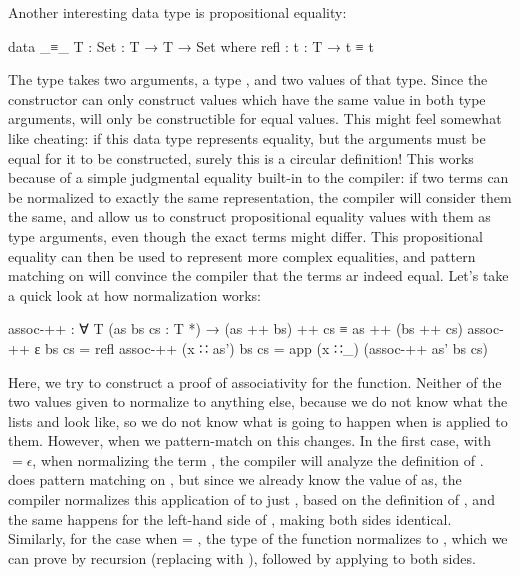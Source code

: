 		Another interesting data type is propositional equality:

		\begin{code}
			data _≡_ {T : Set} : T → T → Set where
			  refl : {t : T} → t ≡ t
		\end{code}

		The type  takes two arguments, a type , and two
		values of that type. Since the constructor can only construct values
		which have the same value in both type arguments,  will
		only be constructible for equal values. This might feel somewhat like
		cheating: if this data type represents equality, but the arguments must
		be equal for it to be constructed, surely this is a circular
		definition! This works because of a simple judgmental equality built-in
		to the compiler: if two terms can be normalized to exactly the same
		representation, the compiler will consider them the same, and allow us
		to construct propositional equality values with them as type arguments,
		even though the exact terms might differ. This propositional equality
		can then be used to represent more complex equalities, and pattern
		matching on  will convince the compiler that the terms ar
		indeed equal. Let's take a quick look at how normalization works:

		\begin{code}
			assoc-++ : ∀ {T} (as bs cs : T *) → (as ++ bs) ++ cs ≡ as ++ (bs ++ cs)
			assoc-++ ε          bs cs = refl
			assoc-++ (x ∷ as')  bs cs = app (x ∷_) (assoc-++ as' bs cs)
		\end{code}

	 	Here, we try to construct a proof of associativity for the
	 	\codett{\_++\_} function. Neither of the two values given to
	 	 normalize to anything else, because we do not know what
	 	the lists  and  look like, so we do not know
	 	what is going to happen when \codett{\_++\_} is applied to them.
	 	However, when we pattern-match on  this changes. In the
	 	first case, with  $=\epsilon$, when normalizing the term
	 	, the compiler will analyze the definition of
	 	\codett{\_++\_}. \codett{\_++\_} does pattern matching on ,
	 	but since we already know the value of as, the compiler normalizes this
	 	application of \codett{\_++\_} to just , based on the
	 	definition of \codett{\_++\_}, and the same happens for the left-hand
	 	side of , making both sides identical.  Similarly, for
	 	the case when  = , the type of the function
	 	normalizes to , which we can prove by recursion (replacing  with
	 	), followed by applying  to both sides.
